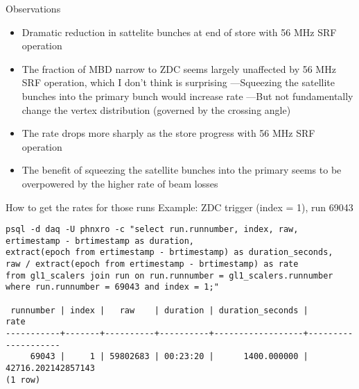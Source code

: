 \documentclass[aspectratio=169,compress,10pt]{beamer}
\begin{document}
\begin{frame}{Observations}
\begin{itemize}
\item Dramatic reduction in sattelite bunches at end of store with 56 MHz SRF operation
\item The fraction of MBD narrow to ZDC seems largely unaffected by 56 MHz SRF operation,
which I don't think is surprising
\newline---Squeezing the satellite bunches into the primary bunch would increase rate
\newline---But not fundamentally change the vertex distribution (governed by the crossing angle)
\item The rate drops more sharply as the store progress with 56 MHz SRF operation
\item The benefit of squeezing the satellite bunches into the primary seems to be overpowered
by the higher rate of beam losses
\end{itemize}
\end{frame}


\begin{frame}[fragile]{How to get the rates for those runs}
Example: ZDC trigger (index = 1), run 69043
\begin{verbatim}
psql -d daq -U phnxro -c "select run.runnumber, index, raw,
ertimestamp - brtimestamp as duration,
extract(epoch from ertimestamp - brtimestamp) as duration_seconds,
raw / extract(epoch from ertimestamp - brtimestamp) as rate
from gl1_scalers join run on run.runnumber = gl1_scalers.runnumber
where run.runnumber = 69043 and index = 1;"

 runnumber | index |   raw    | duration | duration_seconds |        rate        
-----------+-------+----------+----------+------------------+--------------------
     69043 |     1 | 59802683 | 00:23:20 |      1400.000000 | 42716.202142857143
(1 row)

\end{verbatim}
\end{frame}
\end{document}
